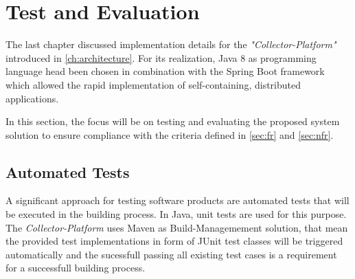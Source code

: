 \chapter{Test and Evaluation}
\label{ch:evaluation}
%
%

The last chapter discussed implementation details for the \textit{"Collector-Platform"} introduced in \autoref{ch:architecture}.
For its realization, Java 8 as programming language head been chosen in combination with the Spring Boot framework which allowed
the rapid implementation of self-containing, distributed applications.

In this section, the focus will be on testing and evaluating the proposed system solution to ensure compliance with the criteria
defined in \autoref{sec:fr} and \autoref{sec:nfr}.

\section{Automated Tests}

A significant approach for testing software products are automated tests that will be executed in the building process.
In Java, unit tests are used for this purpose. The \textit{Collector-Platform} uses Maven as Build-Managemement solution,
that mean the provided test implementations in form of JUnit test classes will be triggered automatically and the sucessfull passing
all existing test cases is a requirement for a successfull building process.

